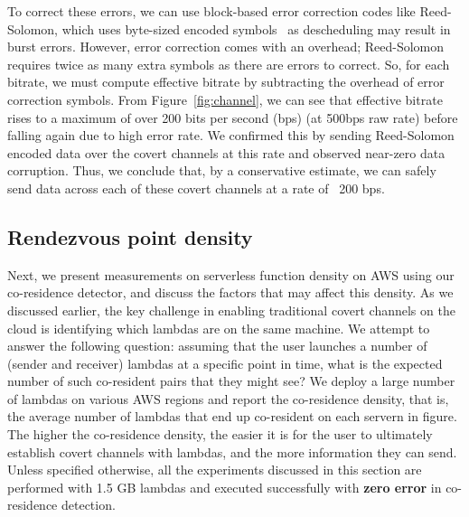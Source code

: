 To correct these errors, we can use block-based error correction codes like
Reed-Solomon, which uses byte-sized encoded symbols~\cite{wuusenix2012} as
descheduling may result in burst errors.
However, error correction comes with an overhead; Reed-Solomon requires twice as
many extra symbols as there are errors to correct. So, for each bitrate, we must compute
effective bitrate by subtracting the overhead of error correction symbols.
From Figure~\ref{fig:channel}, we can see that effective bitrate rises to a
maximum of over 200 bits per second (bps) (at 500bps raw rate) before falling
again due to high error rate. We confirmed this by sending Reed-Solomon encoded
data over the covert channels at this rate and observed near-zero data
corruption. Thus, we conclude that, by a conservative estimate, we can safely
send data across each of these covert channels at a rate of ~200 bps.

\subsection{Rendezvous point density}
Next, we present measurements on serverless function density on AWS using our
co-residence detector, and discuss the factors that may affect this density.  As
we discussed earlier, the key challenge in enabling traditional covert channels
on the cloud is identifying which lambdas are on the same machine. We attempt to
answer the following question: assuming that the user launches a number of
(sender and receiver) lambdas at a specific point in time, what is the expected
number of such co-resident pairs that they might see? We deploy a large number
of lambdas on various AWS regions and report the co-residence density, that is,
the average number of lambdas that end up co-resident on each servern in
figure\todo. The higher the co-residence density, the easier it is for the user
to ultimately establish covert channels with lambdas, and the more information
they can send. Unless specified otherwise, all the experiments discussed in this
section are performed with 1.5 GB lambdas and executed successfully with
\textbf{zero error} in co-residence detection.



